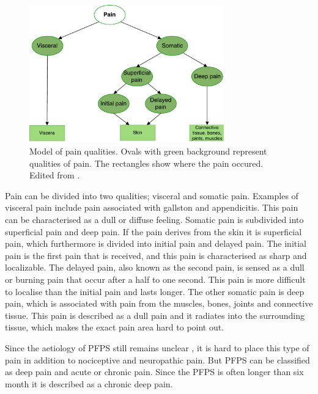 \begin{figure} [H]
\centering
\includegraphics[width=0.75\textwidth]{figures/painpic}
\caption{Model of pain qualities. Ovals with green background  represent qualities of pain. The rectangles show where the pain occured. Edited from \citep{Schmidt2013}.}
\label{fig:qualities}
\end{figure}

\noindent
Pain can be divided into two qualities; visceral and somatic pain. Examples of visceral pain include pain associated with gallston and appendicitis. This pain can be characterised as a dull or diffuse feeling. Somatic pain is subdivided into superficial pain and deep pain. If the pain derives from the skin it is superficial pain, which furthermore is divided into initial pain and delayed pain. The initial pain is the first pain that is received, and this pain is characterised as sharp and localizable. The delayed pain, also known as the second pain, is sensed as a dull or burning pain that occur after a half to one second. This pain is more difficult to localise than the initial pain and lasts longer.\citep{Schmidt1989, Schmidt2013}
The other somatic pain is deep pain, which is associated with pain from the muscles, bones, joints and connective tissue. This pain is described as a dull pain and it radiates into the surrounding tissue, which makes the exact pain area hard to point out.\citep{Schmidt1989, Schmidt2013}


\noindent
Since the aetiology of PFPS still remains unclear \citep{Smith2015}, it is hard to place this type of pain in addition to nociceptive and neuropathic pain. But PFPS can be classified as deep pain and acute or chronic pain. Since the PFPS is often longer than six month it is described as a chronic deep pain. 

